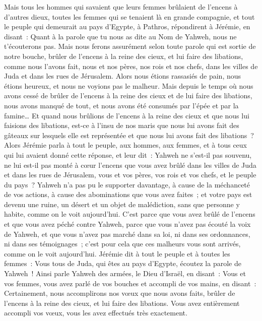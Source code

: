 \begin{multicols}{2}
Mais tous les hommes qui savaient que leurs femmes brûlaient de l'encens à d'autres dieux, toutes les femmes qui se tenaient là en grande compagnie, et tout le peuple qui demeurait au pays d'Egypte, à Pathros, répondirent à Jérémie, en disant~:
Quant à la parole que tu nous as dite au Nom de Yahweh, nous ne t'écouterons pas.
Mais nous ferons assurément selon toute parole qui est sortie de notre bouche, brûler de l'encens à la reine des cieux, et lui faire des libations, comme nous l'avons fait, nous et nos pères, nos rois et nos chefs, dans les villes de Juda et dans les rues de Jérusalem. Alors nous étions rassasiés de pain, nous étions heureux, et nous ne voyions pas le malheur.
Mais depuis le temps où nous avons cessé de brûler de l'encens à la reine des cieux et de lui faire des libations, nous avons manqué de tout, et nous avons été consumés par l'épée et par la famine…
Et quand nous brûlions de l'encens à la reine des cieux et que nous lui faisions des libations, est-ce à l'insu de nos maris que nous lui avons fait des gâteaux sur lesquels elle est représentée et que nous lui avons fait des libations~?
Alors Jérémie parla à tout le peuple, aux hommes, aux femmes, et à tous ceux qui lui avaient donné cette réponse, et leur dit~:
Yahweh ne s'est-il pas souvenu, ne lui est-il pas monté à cœur l'encens que vous avez brûlé dans les villes de Juda et dans les rues de Jérusalem, vous et vos pères, vos rois et vos chefs, et le peuple du pays~?
Yahweh n'a pas pu le supporter davantage, à cause de la méchanceté de vos actions, à cause des abominations que vous avez faites~; et votre pays est devenu une ruine, un désert et un objet de malédiction, sans que personne y habite, comme on le voit aujourd'hui.
C'est parce que vous avez brûlé de l'encens et que vous avez péché contre Yahweh, parce que vous n'avez pas écouté la voix de Yahweh, et que vous n'avez pas marché dans sa loi, ni dans ses ordonnances, ni dans ses témoignages~; c'est pour cela que ces malheurs vous sont arrivés, comme on le voit aujourd'hui.
Jérémie dit à tout le peuple et à toutes les femmes~: Vous tous de Juda, qui êtes au pays d'Egypte, écoutez la parole de Yahweh~!
Ainsi parle Yahweh des armées, le Dieu d'Israël, en disant~: Vous et vos femmes, vous avez parlé de vos bouches et accompli de vos mains, en disant~: Certainement, nous accomplirons nos vœux que nous avons faits, brûler de l'encens à la reine des cieux, et lui faire des libations. Vous avez entièrement accompli vos vœux, vous les avez effectués très exactement.

\end{multicols}

